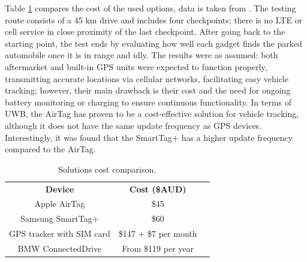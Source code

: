 \documentclass[english]{article}
\begin{document}
\begin{itemize}
  Table \ref{vehicles} compares the cost of the used options, data is taken from \cite{Maric2023}. The testing route consists of a 45 km drive and includes four checkpoints; there is no LTE or cell service in close proximity of the last checkpoint. After going back to the starting point, the test ends by evaluating how well each gadget finds the parked automobile once it is in range and idly. The results were as assumed: both aftermarket and built-in GPS units were expected to function properly, transmitting accurate locations via cellular networks, facilitating easy vehicle tracking; however, their main drawback is their cost and the need for ongoing battery monitoring or charging to ensure continuous functionality. In terms of UWB, the AirTag has proven to be a cost-effective solution for vehicle tracking, although it does not have the same update frequency as GPS devices. Interestingly, it was found that the SmartTag+ has a higher update frequency compared to the AirTag.
  \begin{table}[h] 
    \caption{Solutions cost comparison.}
      \centering
      \begin{tabular}{|c|c|c}
        \cline{1-2}
        \textbf{Device}           & \textbf{Cost (\$AUD)}  &  \\ \cline{1-2}
        Apple AirTag              & \$45                   &  \\ \cline{1-2}
        Samsung SmartTag+         & \$60                   &  \\ \cline{1-2}
        GPS tracker with SIM card & \$147 + \$7 per month &  \\ \cline{1-2}
        BMW ConnectedDrive        & From \$119 per year    &  \\ \cline{1-2}
        \end{tabular}
        \label{vehicles}
      \end{table}


\end{itemize}
\end{document}
